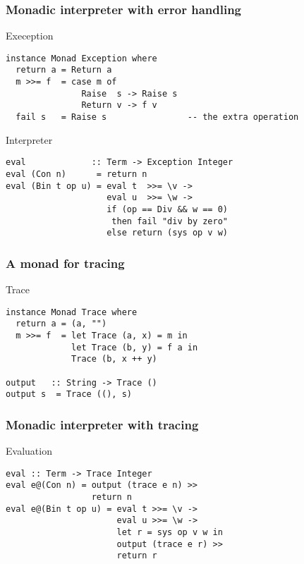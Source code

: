 \documentclass{beamer}
\begin{document}
\begin{frame}[fragile]
  \frametitle{Monadic interpreter with error handling}
  \begin{alertblock}{Exeception}
\begin{lstlisting}
instance Monad Exception where
  return a = Return a
  m >>= f  = case m of 
               Raise  s -> Raise s
               Return v -> f v
  fail s   = Raise s                -- the extra operation
\end{lstlisting}  
\end{alertblock}

\begin{exampleblock}{Interpreter}
\begin{lstlisting}
eval             :: Term -> Exception Integer
eval (Con n)      = return n
eval (Bin t op u) = eval t  >>= \v ->
                    eval u  >>= \w ->
                    if (op == Div && w == 0) 
                     then fail "div by zero"
                    else return (sys op v w)
\end{lstlisting}  
\end{exampleblock}
\end{frame}             



\begin{frame}[fragile]
  \frametitle{A monad for tracing}
  \begin{alertblock}{Trace}
\begin{lstlisting}
instance Monad Trace where
  return a = (a, "")
  m >>= f  = let Trace (a, x) = m in
             let Trace (b, y) = f a in
             Trace (b, x ++ y)

output   :: String -> Trace ()
output s  = Trace ((), s)
\end{lstlisting}  
\end{alertblock}
\end{frame}

\begin{frame}[fragile]
 \frametitle{Monadic interpreter with tracing}
 \begin{exampleblock}{Evaluation}
\begin{lstlisting}
eval :: Term -> Trace Integer
eval e@(Con n) = output (trace e n) >>
                 return n
eval e@(Bin t op u) = eval t >>= \v ->
                      eval u >>= \w ->
                      let r = sys op v w in
                      output (trace e r) >>
                      return r
\end{lstlisting}
\end{exampleblock}      
\end{frame}             
\end{document}
